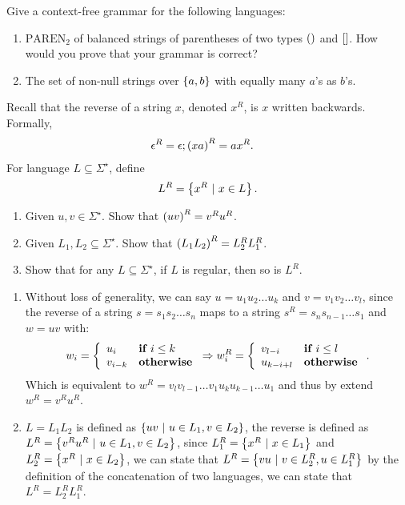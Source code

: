 \documentclass{article}
\begin{document}
\begin{exercise}
Give a context-free grammar for the following languages:
\begin{enumerate}
 \item $\mbox{PAREN}_2$ of balanced strings of parentheses of two types $\left(  \right)$ and $\left[  \right]$. How would you prove that your grammar is correct?
 \item The set of non-null strings over $\left\{ a,b \right\}$ with equally many $a$'s as $b$'s.
\end{enumerate}
\begin{answer}
\end{answer}
\end{exercise}
\begin{exercise}
Recall that the reverse of a string $x$, denoted $x^R$, is $x$ written backwards. Formally,
\begin{eqnarray}
\epsilon^R=\epsilon;&\left( xa \right)^R=ax^R.
\end{eqnarray}
For language $L\subseteq\Sigma^{\star}$, define
\begin{equation}
L^R=\left\{ x^R\ |\ x\in L \right\}.
\end{equation}
\begin{enumerate}
 \item Given $u,v\in\Sigma^{\star}$. Show that $\left( uv \right)^R=v^Ru^R$.
 \item Given $L_1,L_2\subseteq\Sigma^{\star}$. Show that $\left( L_1 L_2 \right)^R=L_2^RL_1^R$.
 \item Show that for any $L\subseteq\Sigma^{\star}$, if $L$ is regular, then so is $L^R$.
\end{enumerate}
\begin{answer}
\begin{enumerate}
 \item Without loss of generality, we can say $u=u_1u_2\ldots u_k$ and $v=v_1v_2\ldots v_l$, since the reverse of a string $s=s_1s_2\ldots s_n$ maps to a string $s^R=s_ns_{n-1}\ldots s_1$ and $w=uv$ with:
 \begin{equation}
  w_i=\left\{\begin{array}{ll} u_i&\mbox{\bf if } i\leq k\\v_{i-k}&\mbox{\bf otherwise} \end{array}\right.\Rightarrow w_i^R=\left\{\begin{array}{ll} v_{l-i}&\mbox{\bf if } i\leq l\\u_{k-i+l}&\mbox{\bf otherwise} \end{array}\right..
 \end{equation}
Which is equivalent to $w^R=v_lv_{l-1}\ldots v_1u_ku_{k-1}\ldots u_1$ and thus by extend $w^R=v^Ru^R$.
 \item $L=L_1L_2$ is defined as $\left\{ uv\ |\ u\in L_1,v\in L_2 \right\}$, the reverse is defined as $L^R=\left\{ v^Ru^R\ |\ u\in L_1,v\in L_2 \right\}$, since $L_1^R=\left\{ x^R\ |\ x\in L_1 \right\}$ and $L_2^R=\left\{ x^R\ |\ x\in L_2 \right\}$, we can state that $L^R=\left\{ vu\ |\ v\in L_2^R,u\in L_1^R \right\}$ by the definition of the concatenation of two languages, we can state that $L^R=L_2^RL_1^R$.

\end{enumerate}
\end{answer}
\end{exercise}
\end{document}
